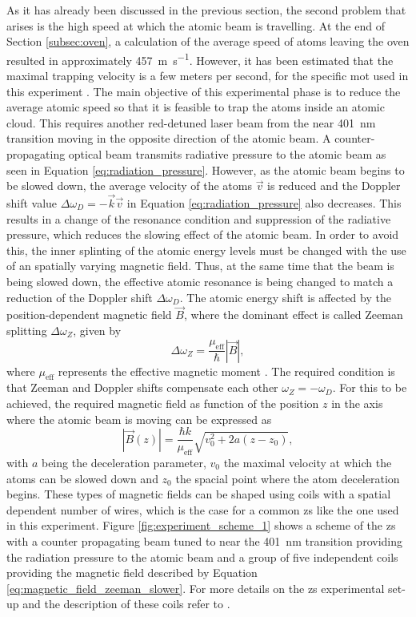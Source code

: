 As it has already been discussed in the previous section, the second problem that arises is the high speed at which the atomic beam is travelling. At the end of Section \ref{subsec:oven}, a calculation of the average speed of atoms leaving the oven resulted in approximately \SI{457}{\meter\per\second}. However, it has been estimated that the maximal trapping velocity is a few meters per second, for the specific \acl{mot} used in this experiment \cite{Ulitzsch2016}. The main objective of this experimental phase is to reduce the average atomic speed so that it is feasible to trap the atoms inside an atomic cloud. This requires another red-detuned laser beam from the near \SI{401}{\nano\meter} transition moving in the opposite direction of the atomic beam. A counter-propagating optical beam transmits radiative pressure to the atomic beam as seen in Equation \eqref{eq:radiation_pressure}. However, as the atomic beam begins to be slowed down, the average velocity of the atoms $\vec{v}$ is reduced and the Doppler shift value $\Delta \omega_D = -\vec{k}\vec{v}$ in Equation \eqref{eq:radiation_pressure} also decreases. This results in a change of the resonance condition and suppression of the radiative pressure, which reduces the slowing effect of the atomic beam. In order to avoid this, the inner splinting of the atomic energy levels must be changed with the use of an spatially varying magnetic field. Thus, at the same time that the beam is being slowed down, the effective atomic resonance is being changed to match a reduction of the Doppler shift $\Delta \omega_D$. The atomic energy shift is affected by the position-dependent magnetic field $\vec{B}$, where the dominant effect is called Zeeman splitting $\Delta \omega_Z$, given by \cite{Zeeman1897}
\begin{equation}
	\Delta \omega_Z = \frac{\mu_{\text{eff}}}{\hbar} |\vec{B}|,
\end{equation}
where $\mu_{\text{eff}}$ represents the effective magnetic moment \cite{Metcalf1999}. The required condition is that Zeeman and Doppler shifts compensate each other $\omega_Z = -\omega_D$. For this to be achieved, the required magnetic field as function of the position $z$ in the axis where the atomic beam is moving can be expressed as
\begin{equation}\label{eq:magnetic_field_zeeman_slower}
	|\vec{B}(z)| = \frac{\hbar k}{\mu_{\text{eff}}}\sqrt{v_0^2 + 2 a(z-z_0)},
\end{equation}
with $a$ being the deceleration parameter, $v_0$ the maximal velocity at which the atoms can be slowed down and $z_0$ the spacial point where the atom deceleration begins. These types of magnetic fields can be shaped using coils with a spatial dependent number of wires, which is the case for a common \acf{zs} like the one used in this experiment. Figure \ref{fig:experiment_scheme_1} shows a scheme of the \ac{zs} with a counter propagating beam tuned to near the \SI{401}{\nano\meter} transition providing the radiation pressure to the atomic beam and a group of five independent coils providing the magnetic field described by Equation \eqref{eq:magnetic_field_zeeman_slower}. For more details on the \ac{zs} experimental set-up and the description of these coils refer to \cite{Rehberger2013}.

